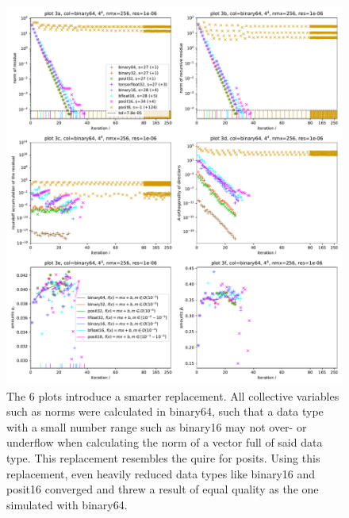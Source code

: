 \documentclass{article}
\theoremstyle{plain} %
\theoremstyle{convention} %
\theoremstyle{remark} %
\numberwithin{equation}{section}
\begin{document}
\begin{figure}
    \centering
    \includegraphics[width=1.0\textwidth]{plots/cgne_final_2}
    \caption{The 6 plots introduce a smarter replacement. All collective variables such as norms were calculated in \gls{binary64}, such that a data type with a small number range such as \gls{binary16} may not over- or underflow when calculating the norm of a vector full of said data type. This replacement resembles the \gls{quire} for posits. Using this replacement, even heavily reduced data types like \gls{binary16} and \gls{posit16} converged and threw a result of equal quality as the one simulated with \gls{binary64}.}
    \label{fig:cgne:col64}
\end{figure}
\end{document}
